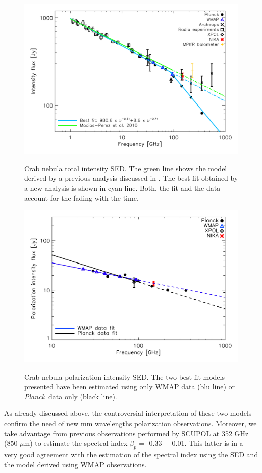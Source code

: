 \documentclass[twocolumn,traditabstract]{aa}
\def\Planck{\textit{Planck}}
\begin{document}
\begin{figure}
  \centering
          { \includegraphics[width=1\linewidth,keepaspectratio]{figures/Crab_SED_i_150.pdf}}
           \caption{Crab nebula total intensity SED. The green line shows the model derived by a previous analysis discussed in \citep{macias2010}. The best-fit obtained by a new analysis is shown in cyan line. Both, the fit and the data account for the fading with the time.}
\label{crab_SED}		
  \end{figure} 

\begin{figure}
  \centering
             { \includegraphics[width=1\linewidth,keepaspectratio]{figures/Crab_SED_ipol.pdf}}
           \caption{Crab nebula polarization intensity SED. The two best-fit models presented have been estimated using only WMAP data (blu line) or \Planck\ data only (black line).}
\label{crab_SED_ipol}		
  \end{figure} 
 \noindent
As already discussed above, the controversial interpretation of these two models confirm the need of new mm wavelengths polarization observations.
Moreover, we take advantage from previous observations performed by SCUPOL at 352 GHz (850 $\mu$m) to estimate the spectral index $\beta_p$ = -0.33 $\pm$ 0.01. This latter is in a very good agreement with the estimation of the spectral index using the SED and the model derived using WMAP observations. 
\end{document}
